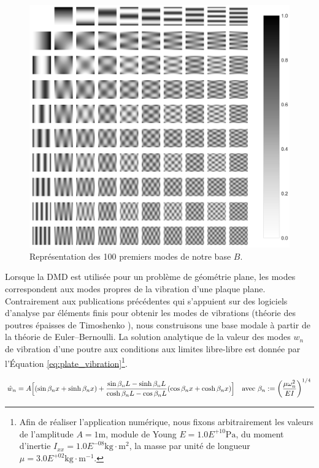 \begin{figure}[p]
	\centering
	\includegraphics[width=\textwidth]{../Chap2/Figures/DMD_100modes_10x10_scaled.jpg}
	\caption{Représentation des 100 premiers modes de notre base $B$.}
	\label{fig:plate_eigenmodes}
\end{figure}

Lorsque la DMD est utilisée pour un problème de géométrie plane, les modes correspondent aux modes propres de la vibration d'une plaque plane.
Contrairement aux publications précédentes qui s'appuient sur des logiciels d'analyse par éléments finis pour obtenir les modes de vibrations (théorie des poutres épaisses de Timoshenko \cite{timoshenko_vibration_1937}), nous construisons une base modale à partir de la théorie de Euler–Bernoulli.
La solution analytique de la valeur des modes $w_n$ de vibration d'une poutre aux conditions aux limites libre-libre est donnée par l'Équation \ref{eq:plate_vibration}\footnote{Afin de réaliser l'application numérique, nous fixons arbitrairement les valeurs de l'amplitude $A=1 \text{m}$,  module de Young $E = 1.0E^{+10} \text{Pa}$, du moment d'inertie $I_{{xx}} = 1.0E^{-08} \text{kg}\cdot \text{m}^2$, la masse par unité de longueur $\mu = 3.0E^{+02} \text{kg}\cdot \text{m}^{-1}$.}.

\begin{equation}
{\displaystyle {\hat {w}}_{n}=A{\Bigl [}(\sin \beta _{n}x+\sinh \beta _{n}x)+{\frac {\sin \beta _{n}L-\sinh \beta _{n}L}{\cosh \beta _{n}L-\cos \beta _{n}L}}(\cos \beta _{n}x+\cosh \beta _{n}x){\Bigr ]}} {\quad \text{avec}} \ \beta _{n}:=\left({\frac  {\mu \omega _{n}^{2}}{EI}}\right)^{{1/4}}
\label{eq:plate_vibration}
\end{equation}

